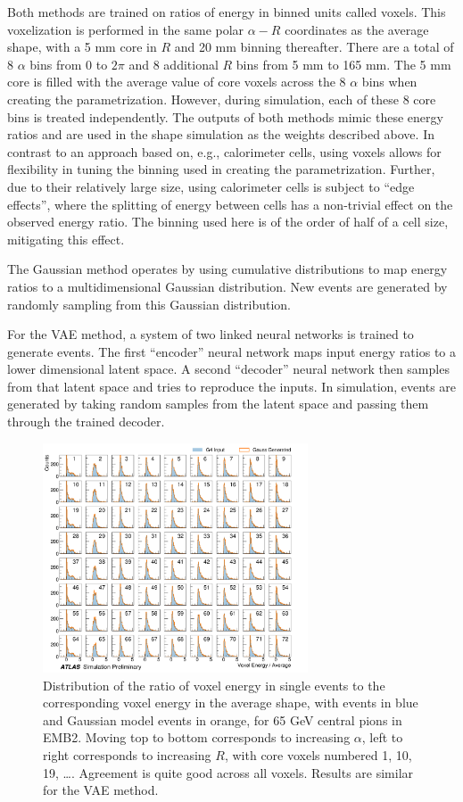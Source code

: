 Both methods are trained on ratios of energy in binned units called voxels. This voxelization is performed in the same polar 
$\alpha-R$ coordinates as the average shape, with a 5 mm core in $R$ and 20 mm binning thereafter. There are a total of 8 
$\alpha$ bins from 0 to $2\pi$ and 8 additional $R$ bins from 5 mm to 165 mm. The 5 mm core is filled with the average value 
of core voxels across the 8 $\alpha$ bins when creating the parametrization. However, during simulation, each of these 8 core 
bins is treated independently. The outputs of both methods mimic these energy ratios and are used in the shape simulation as 
the weights described above. In contrast to an approach based on, e.g., calorimeter cells, using voxels allows for 
flexibility in tuning the binning used in creating the parametrization. Further, due to their relatively large size, using 
calorimeter cells is subject to ``edge effects'', where the splitting of energy between cells has a non-trivial effect on the 
observed energy ratio. The binning used here is of the order of half of a cell size, mitigating this effect.

The Gaussian method operates by using cumulative distributions to map \GEANT energy ratios to a multidimensional Gaussian 
distribution. New events are generated by randomly sampling from this Gaussian distribution.

For the VAE method, a system of two linked neural networks is trained to generate events. The first ``encoder'' neural 
network maps input \GEANT energy ratios to a lower dimensional latent space. A second ``decoder'' neural network then samples 
from that latent space and tries to reproduce the inputs. In simulation, events are generated by taking random samples from 
the latent space and passing them through the trained decoder.

\begin{figure}[ht!]
\centering
\includegraphics[width=0.7\textwidth]{figures/FCS-fig-02.pdf}
\caption{Distribution of the ratio of voxel energy in single events to the corresponding voxel energy in the average shape, with \GEANT events in blue and Gaussian model events in orange, for 65 GeV central pions in EMB2. Moving top to bottom corresponds to increasing $\alpha$, left to right corresponds to increasing $R$, with core voxels numbered 1, 10, 19, \ldots. Agreement is quite good across all voxels. Results are similar for the VAE method.}
\label{fig-3}       %
\end{figure}

